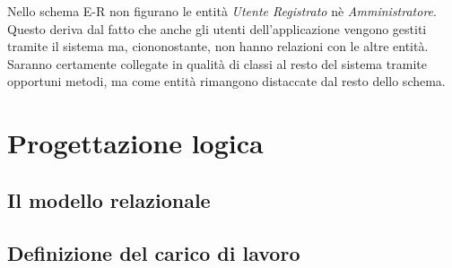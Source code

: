 \documentclass[12pt,a4paper,onecolumn,x11names]{article}
\begin{document}
	\begin{flushleft}
		Nello schema E-R non figurano le entità \textit{Utente Registrato} nè \textit{Amministratore}. Questo deriva dal fatto che anche gli utenti dell'applicazione vengono gestiti tramite il sistema ma, ciononostante, non hanno relazioni con le altre entità. Saranno certamente collegate in qualità di classi al resto del sistema tramite opportuni metodi, ma come entità rimangono distaccate dal resto dello schema.
		
	\end{flushleft}
	
		\newpage

\section{Progettazione logica}

\subsection{Il modello relazionale}

\subsection{Definizione del carico di lavoro}
\end{document}

